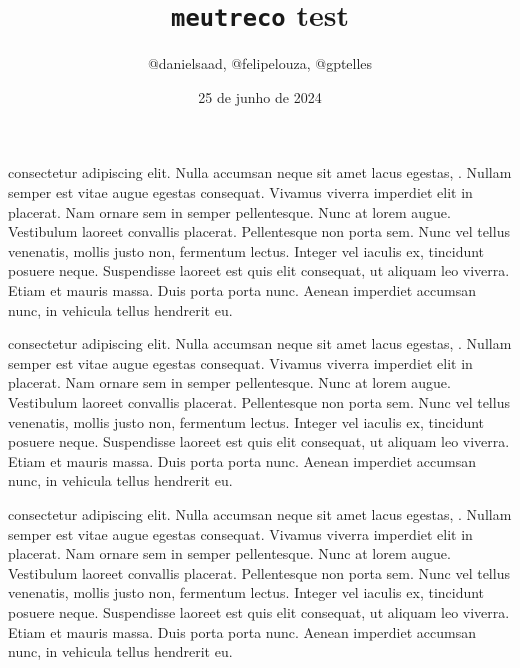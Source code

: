 \documentclass[12pt]{article}
\title{\texttt{meutreco} test}
\author{@danielsaad, @felipelouza, @gptelles}
\begin{document}
\date{25 de junho de 2024}
\maketitle

\listofchanges




 consectetur adipiscing elit. Nulla accumsan neque sit amet lacus egestas, . Nullam semper est vitae augue egestas consequat. Vivamus viverra imperdiet elit in placerat. Nam ornare sem in semper pellentesque. Nunc at lorem augue. Vestibulum laoreet convallis placerat. Pellentesque non porta sem. Nunc vel tellus venenatis, mollis justo non, fermentum lectus. Integer vel iaculis ex, tincidunt posuere neque. Suspendisse laoreet est quis elit consequat, ut aliquam leo viverra. Etiam et mauris massa. Duis porta porta nunc. Aenean imperdiet accumsan nunc, in vehicula tellus hendrerit eu.



 consectetur adipiscing elit. Nulla accumsan neque sit amet lacus egestas, . Nullam semper est vitae augue egestas consequat. Vivamus viverra imperdiet elit in placerat. Nam ornare sem in semper pellentesque. Nunc at lorem augue. Vestibulum laoreet convallis placerat. Pellentesque non porta sem. Nunc vel tellus venenatis, mollis justo non, fermentum lectus. Integer vel iaculis ex, tincidunt posuere neque. Suspendisse laoreet est quis elit consequat, ut aliquam leo viverra. Etiam et mauris massa. Duis porta porta nunc. Aenean imperdiet accumsan nunc, in vehicula tellus hendrerit eu.



 consectetur adipiscing elit. Nulla accumsan neque sit amet lacus egestas, . Nullam semper est vitae augue egestas consequat. Vivamus viverra imperdiet elit in placerat. Nam ornare sem in semper pellentesque. Nunc at lorem augue. Vestibulum laoreet convallis placerat. Pellentesque non porta sem. Nunc vel tellus venenatis, mollis justo non, fermentum lectus. Integer vel iaculis ex, tincidunt posuere neque. Suspendisse laoreet est quis elit consequat, ut aliquam leo viverra. Etiam et mauris massa. Duis porta porta nunc. Aenean imperdiet accumsan nunc, in vehicula tellus hendrerit eu.
\end{document}
